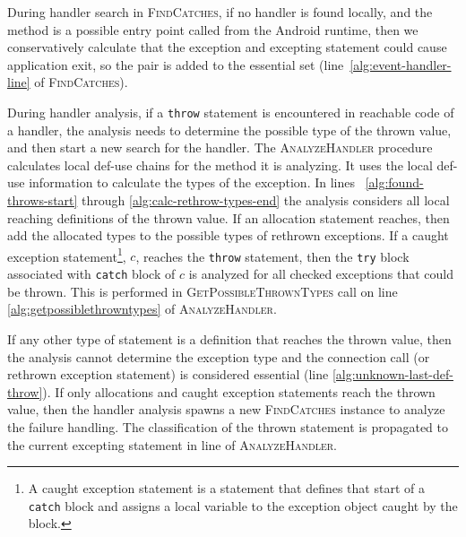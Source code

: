 
During handler search in \textsc{FindCatches}, if no handler is found
locally, and the method is a possible entry point called from the
Android runtime, then we conservatively calculate that the exception
and excepting statement could cause application exit, so the pair is
added to the essential set (line~\ref{alg:event-handler-line} of
\textsc{FindCatches}). 

During handler analysis, if a \lstinline!throw! statement is
encountered in reachable code of a handler, the analysis needs to
determine the possible type of the thrown value, and then start a new
search for the handler.  The \textsc{AnalyzeHandler} procedure
calculates local def-use chains for the method it is analyzing.  It
uses the local def-use information to calculate the types of the
exception.  In lines ~\ref{alg:found-throws-start} through
\ref{alg:calc-rethrow-types-end} the analysis considers all local
reaching definitions of the thrown value.  If an allocation statement
reaches, then add the allocated types to the possible types of
rethrown exceptions. If a caught exception statement\footnote{A caught
  exception statement is a statement that defines that start of a
  \lstinline!catch! block and assigns a local variable to the
  exception object caught by the block.}, $c$, reaches the
\lstinline!throw! statement, then the \lstinline!try! block associated
with \lstinline!catch! block of $c$ is analyzed for all checked
exceptions that could be thrown.  This is performed in
\textsc{GetPossibleThrownTypes} call on line
\ref{alg:getpossiblethrowntypes} of \textsc{AnalyzeHandler}.

If any other type of statement is a definition that reaches the thrown
value, then the analysis cannot determine the exception type and the
connection call (or rethrown exception statement) is considered
essential (line \ref{alg:unknown-last-def-throw}).  If only
allocations and caught exception statements reach the thrown value,
then the handler analysis spawns a new \textsc{FindCatches} instance
to analyze the failure handling.  The classification of the thrown
statement is propagated to the current excepting statement in
line \label{alg:progagate-line} of \textsc{AnalyzeHandler}.

